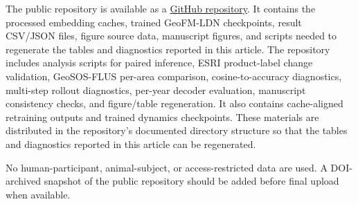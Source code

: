 \documentclass{article}
\begin{document}
The public repository is available as a \href{https://github.com/zhouning/paper58-geofm-world-model-rl}{GitHub repository}. It contains the processed embedding caches, trained GeoFM-LDN checkpoints, result CSV/JSON files, figure source data, manuscript figures, and scripts needed to regenerate the tables and diagnostics reported in this article. The repository includes analysis scripts for paired inference, ESRI product-label change validation, GeoSOS-FLUS per-area comparison, cosine-to-accuracy diagnostics, multi-step rollout diagnostics, per-year decoder evaluation, manuscript consistency checks, and figure/table regeneration. It also contains cache-aligned retraining outputs and trained dynamics checkpoints. These materials are distributed in the repository's documented directory structure so that the tables and diagnostics reported in this article can be regenerated.

No human-participant, animal-subject, or access-restricted data are used. A DOI-archived snapshot of the public repository should be added before final upload when available.
\end{document}
